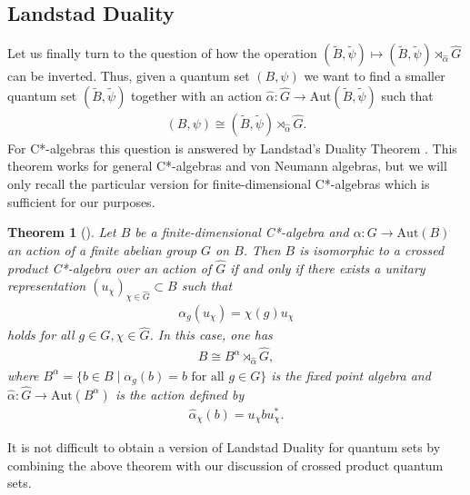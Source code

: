 \documentclass{amsart}
\newtheorem{thm}{Theorem}[section]
\theoremstyle{definition}
\theoremstyle{definition}
\begin{document}
\subsection{Landstad Duality}

Let us finally turn to the question of how the operation $(\tilde{B}, \tilde{\psi}) \mapsto (\tilde{B}, \tilde{\psi}) \rtimes_{\hat{\alpha}} \hat{G}$ can be inverted. Thus, given a quantum set $(B, \psi)$ we want to find a smaller quantum set $(\tilde{B}, \tilde{\psi})$ together with an action $\hat{\alpha}: \hat{G} \to \mathrm{Aut}(\tilde{B}, \tilde{\psi})$ such that
\begin{align*}
    (B, \psi) \cong (\tilde{B}, \tilde{\psi}) \rtimes_{\hat{\alpha}} \hat{G}.
\end{align*}
For C*-algebras this question is answered by Landstad's Duality Theorem \cite{landstad_duality_1979}. This theorem works for general C*-algebras and von Neumann algebras, but we will only recall the particular version for finite-dimensional C*-algebras which is sufficient for our purposes.

\begin{thm}[{\cite[Theorem 2]{landstad_duality_1979}}]
    \label{pre::thm:landstads_thm}
    Let $B$ be a finite-dimensional C*-algebra and $\alpha: G \to \mathrm{Aut}(B)$ an action of a finite abelian group $G$ on $B$. Then $B$ is isomorphic to a crossed product C*-algebra over an action of $\hat{G}$ if and only if there exists a unitary representation $(u_\chi)_{\chi \in \hat{G}} \subset B$ such that
    \begin{align*}
        \alpha_g(u_\chi) = \chi(g)u_\chi
    \end{align*}
    holds for all $g \in G, \chi \in \hat{G}$. In this case, one has 
    \begin{align*}
        B \cong B^\alpha \rtimes_{\hat{\alpha}} \hat{G},
    \end{align*}
    where $B^\alpha = \{b \in B \mid \alpha_g(b) = b \text{ for all } g \in G\}$ is the fixed point algebra and $\hat{\alpha}: \hat{G} \to \mathrm{Aut}(B^\alpha)$ is the action defined by 
    \begin{align*}
        \hat{\alpha}_\chi(b) = u_\chi b u_\chi^\ast.
    \end{align*}
\end{thm}

It is not difficult to obtain a version of Landstad Duality for quantum sets by combining the above theorem with our discussion of crossed product quantum sets.
\end{document}
